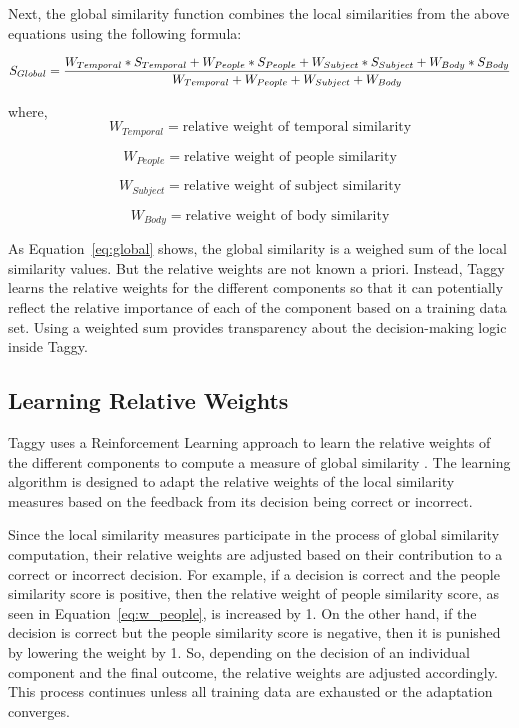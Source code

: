 Next, the global similarity function combines the local similarities from the above equations using the following formula:

\begin{equation}
	\label{eq:global}
S_{Global} = \frac{W_{Temporal} * S_{Temporal} + W_{People} * S_{People} + W_{Subject} * S_{Subject} + W_{Body} * S_{Body}} {W_{Temporal} + W_{People} + W_{Subject} + W_{Body}}\\
\end{equation}

where,
\begin{equation}
	\label{eq:w_temporal}	
W_{Temporal} = \mbox{relative weight of temporal similarity}
\end{equation}      

\begin{equation}   
		\label{eq:w_people}
W_{People} = \mbox{relative weight of people similarity}
\end{equation}

\begin{equation}     
		\label{eq:w_subject}
W_{Subject} = \mbox{relative weight of subject similarity}
\end{equation}

\begin{equation}     
		\label{eq:w_body}
W_{Body} = \mbox{relative weight of body similarity}
\end{equation}

As Equation~\ref{eq:global} shows, the global similarity is a weighed sum of the local similarity values. But the relative weights are not known a priori. Instead, Taggy learns the relative weights for the different components so that it can potentially reflect the relative importance of each of the component based on a training data set. Using a weighted sum provides transparency about the decision-making logic inside Taggy.
	
\subsection{Learning Relative Weights}	
\label{sec:learning}
Taggy uses a Reinforcement Learning approach to learn the relative weights of the different components to compute a measure of global similarity \cite{reinforcement_learning}. The learning algorithm is designed to adapt the relative weights of the local similarity measures based on the feedback from its decision being correct or incorrect.

Since the local similarity measures participate in the process of global similarity computation, their relative weights are adjusted based on their contribution to a correct or incorrect decision. For example, if a decision is correct and the people similarity score is positive, then the relative weight of people similarity score, as seen in Equation~\ref{eq:w_people}, is increased by 1. On the other hand, if the decision is correct but the people similarity score is negative, then it is punished by lowering the weight by 1. So, depending on the decision of an individual component and the final outcome, the relative weights are adjusted accordingly. This process continues unless all training data are exhausted or the adaptation converges.

